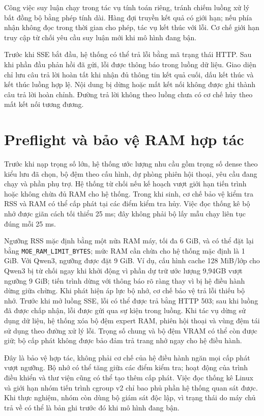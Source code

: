 Công việc suy luận chạy trong tác vụ tính toán riêng, tránh chiếm luồng xử lý bất đồng bộ bằng phép tính dài. Hàng đợi truyền kết quả có giới hạn; nếu phía nhận không đọc trong thời gian cho phép, tác vụ kết thúc với lỗi. Cơ chế giới hạn truy cập từ chối yêu cầu suy luận mới khi mô hình đang bận.

Trước khi SSE bắt đầu, hệ thống có thể trả lỗi bằng mã trạng thái HTTP. Sau khi phần đầu phản hồi đã gửi, lỗi được thông báo trong luồng dữ liệu. Giao diện chỉ lưu câu trả lời hoàn tất khi nhận đủ thông tin kết quả cuối, dấu kết thúc và kết thúc luồng hợp lệ. Nội dung bị dừng hoặc mất kết nối không được ghi thành câu trả lời hoàn chỉnh. Đường trả lời không theo luồng chưa có cơ chế hủy theo mất kết nối tương đương.

\section{Preflight và bảo vệ RAM hợp tác}

Trước khi nạp trọng số lớn, hệ thống ước lượng nhu cầu gồm trọng số dense theo kiểu lưu đã chọn, bộ đệm theo cấu hình, dự phòng phiên hội thoại, yêu cầu đang chạy và phần phụ trợ. Hệ thống từ chối nếu kế hoạch vượt giới hạn tiến trình hoặc không chừa đủ RAM cho hệ thống. Trong khi sinh, cơ chế bảo vệ kiểm tra RSS và RAM có thể cấp phát tại các điểm kiểm tra hủy. Việc đọc thống kê bộ nhớ được giãn cách tối thiểu 25 ms; đây không phải bộ lấy mẫu chạy liên tục đúng mỗi 25 ms.

Ngưỡng RSS mặc định bằng một nửa RAM máy, tối đa 6 GiB, và có thể đặt lại bằng \texttt{MOE\_RAM\_LIMIT\_BYTES}; mức RAM cần chừa cho hệ thống mặc định là 1 GiB. Với Qwen3, ngưỡng được đặt 9 GiB. Ví dụ, cấu hình cache 128 MiB/lớp cho Qwen3 bị từ chối ngay khi khởi động vì phần dự trữ ước lượng 9,94GB vượt ngưỡng 9 GiB; tiến trình dừng với thông báo rõ ràng thay vì bị hệ điều hành dừng giữa chừng. Khi phát hiện áp lực bộ nhớ, cơ chế bảo vệ trả lỗi thiếu bộ nhớ. Trước khi mở luồng SSE, lỗi có thể được trả bằng HTTP 503; sau khi luồng đã được chấp nhận, lỗi được gửi qua sự kiện trong luồng. Khi tác vụ dừng sử dụng dữ liệu, hệ thống xóa bộ đệm expert RAM, phiên hội thoại và vùng đệm tái sử dụng theo đường xử lý lỗi. Trọng số chung và bộ đệm VRAM có thể còn được giữ; bộ cấp phát không được bảo đảm trả trang nhớ ngay cho hệ điều hành.

Đây là bảo vệ hợp tác, không phải cơ chế của hệ điều hành ngăn mọi cấp phát vượt ngưỡng. Bộ nhớ có thể tăng giữa các điểm kiểm tra; hoạt động của trình điều khiển và thư viện cũng có thể tạo thêm cấp phát. Việc đọc thống kê Linux và giới hạn nhóm tiến trình cgroup v2 chỉ bao phủ phần hệ thống quan sát được. Khi thực nghiệm, nhóm còn dùng bộ giám sát độc lập, vì trạng thái do máy chủ trả về có thể là bản ghi trước đó khi mô hình đang bận.

